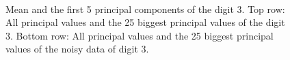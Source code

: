 \documentclass[a4paper, 12pt, titlepage]{article}
\begin{document}
\begin{figure}[H]
	\centering
	\\
	\caption{\protect{} Mean and the first 5 principal components of the digit 3. \protect{} Top row: All principal values and the 25 biggest principal values of the digit 3. Bottom row: All principal values and the 25 biggest principal values of the noisy data of digit 3.}
\end{figure}
\end{document}
